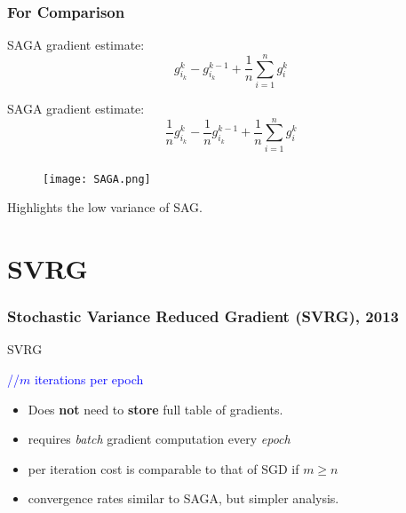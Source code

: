 \documentclass{beamer}
\begin{document}
\begin{frame}
  \frametitle{For Comparison}
  SAGA gradient estimate:
  \begin{equation}
    g_{i_k}^k - g_{i_k}^{k-1} + \frac{1}{n}\sum_{i=1}^{n} g_i^k
  \end{equation}

  SAGA gradient estimate:
  \begin{equation}
    \frac{1}{n}g_{i_k}^k - \frac{1}{n}g_{i_k}^{k-1} + \frac{1}{n}\sum_{i=1}^{n} g_i^k
  \end{equation}

\end{frame}

\begin{frame}
  \frametitle{}

  \begin{figure}[ht]
    \centering
    \texttt{[image: SAGA.png]}
  \end{figure}
  Highlights the low variance of SAG.
\end{frame}


\section{SVRG}%

\begin{frame}
  \frametitle{Stochastic Variance Reduced Gradient (SVRG), 2013}

  \begin{algorithm}[H]
    \caption{SVRG}\label{}
    \begin{algorithmic}[1]
      \hfill \textcolor{blue}{//$m$ iterations per epoch}
      \EndFor{}
      \EndFor{}
    \end{algorithmic}
  \end{algorithm}

  \begin{itemize}
    \item Does \textbf{not} need to \textbf{store} full table of gradients.
    \item requires \emph{batch} gradient computation every \emph{epoch}
    \item per iteration cost is comparable to that of SGD if $m \ge n$
    \item convergence rates similar to SAGA, but simpler analysis.
  \end{itemize}
\end{frame}
\end{document}
